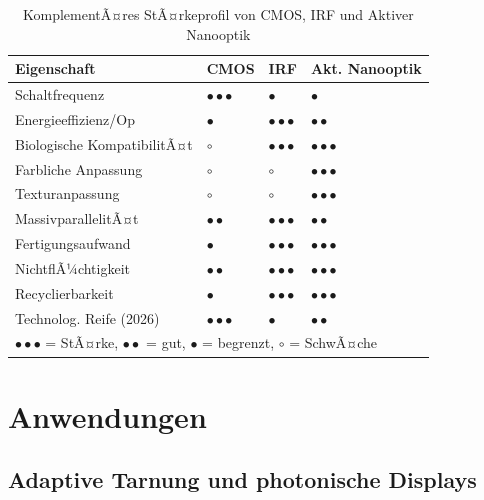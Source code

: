 ﻿\documentclass[a4paper,12pt]{scrreprt}
\theoremstyle{definition}
\begin{document}
\begin{table}[H]
  \centering
  \caption{KomplementÃ¤res StÃ¤rkeprofil von CMOS, IRF und Aktiver Nanooptik}
  \label{tab:vergleich}
  \begin{tabular}{p{4.5cm}p{3cm}p{3cm}p{3cm}}
    \toprule
    \textbf{Eigenschaft} & \textbf{CMOS} & \textbf{IRF} & \textbf{Akt. Nanooptik} \\
    \midrule
    Schaltfrequenz              & $\bullet\bullet\bullet$ & $\bullet$   & $\bullet$ \\
    Energieeffizienz/Op         & $\bullet$   & $\bullet\bullet\bullet$ & $\bullet\bullet$ \\
    Biologische KompatibilitÃ¤t  & $\circ$     & $\bullet\bullet\bullet$ & $\bullet\bullet\bullet$ \\
    Farbliche Anpassung         & $\circ$     & $\circ$                 & $\bullet\bullet\bullet$ \\
    Texturanpassung             & $\circ$     & $\circ$                 & $\bullet\bullet\bullet$ \\
    MassivparallelitÃ¤t          & $\bullet\bullet$ & $\bullet\bullet\bullet$ & $\bullet\bullet$ \\
    Fertigungsaufwand           & $\bullet$   & $\bullet\bullet\bullet$ & $\bullet\bullet\bullet$ \\
    NichtflÃ¼chtigkeit           & $\bullet\bullet$ & $\bullet\bullet\bullet$ & $\bullet\bullet\bullet$ \\
    Recyclierbarkeit            & $\bullet$   & $\bullet\bullet\bullet$ & $\bullet\bullet\bullet$ \\
    Technolog. Reife (2026)     & $\bullet\bullet\bullet$ & $\bullet$ & $\bullet\bullet$ \\
    \bottomrule
    \multicolumn{4}{l}{\small $\bullet\bullet\bullet$ = StÃ¤rke, $\bullet\bullet$ = gut, $\bullet$ = begrenzt, $\circ$ = SchwÃ¤che}
  \end{tabular}
\end{table}

\section{Anwendungen}

\subsection{Adaptive Tarnung und photonische Displays}
\end{document}
